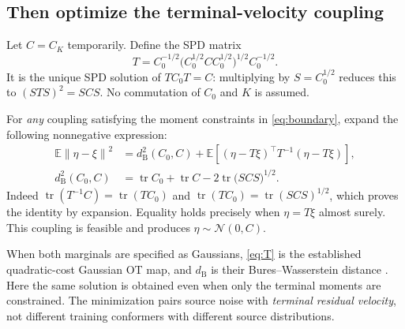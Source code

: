 \documentclass[11pt,letterpaper]{article}
\newcommand{\E}{\mathbb E}
\newcommand{\cN}{\mathcal N}
\newcommand{\tr}{\operatorname{tr}}
\newcommand{\norm}[1]{\left\lVert#1\right\rVert}
\newcommand{\bures}{d_{\mathrm B}}
\begin{document}
\subsection{Then optimize the terminal-velocity coupling}
Let $C=C_K$ temporarily. Define the SPD matrix
\begin{equation}
T=C_0^{-1/2}\bigl(C_0^{1/2}CC_0^{1/2}\bigr)^{1/2}C_0^{-1/2}.
\label{eq:T}
\end{equation}
It is the unique SPD solution of $TC_0T=C$: multiplying by $S=C_0^{1/2}$ reduces this to $(STS)^2=SCS$. No commutation of $C_0$ and $K$ is assumed.

For \emph{any} coupling satisfying the moment constraints in \eqref{eq:boundary}, expand the following nonnegative expression:
\begin{equation}
\begin{split}
\E\norm{\eta-\xi}^2
&=\bures^2(C_0,C)+\E[(\eta-T\xi)^\top T^{-1}(\eta-T\xi)],\\
\bures^2(C_0,C)
&=\tr C_0+\tr C-2\tr\bigl(SCS\bigr)^{1/2}.
\end{split}
\label{eq:coupling-gap}
\end{equation}
Indeed $\tr(T^{-1}C)=\tr(TC_0)$ and $\tr(TC_0)=\tr(SCS)^{1/2}$, which proves the identity by expansion. Equality holds precisely when $\eta=T\xi$ almost surely. This coupling is feasible and produces $\eta\sim\cN(0,C)$.

When both marginals are specified as Gaussians, \eqref{eq:T} is the established quadratic-cost Gaussian OT map, and $\bures$ is their Bures--Wasserstein distance \cite{bhatia}. Here the same solution is obtained even when only the terminal moments are constrained. The minimization pairs source noise with \emph{terminal residual velocity}, not different training conformers with different source distributions.
\end{document}

